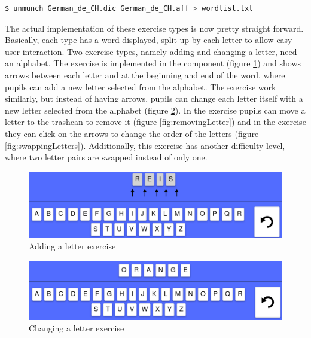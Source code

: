 \begin{lstlisting}[language=Bash,caption={Bash command to unmunch a dictionary file and a affix file to a list of words},label={lst:unmunch}]
$ unmunch German_de_CH.dic German_de_CH.aff > wordlist.txt
\end{lstlisting}

The actual implementation of these exercise types is now pretty straight forward. Basically, each type has a word displayed, split up by each letter to allow easy user interaction. Two exercise types, namely adding and changing a letter, need an alphabet. The  exercise is implemented in the  component (figure \ref{fig:addingLetter}) and shows arrows between each letter and at the beginning and end of the word, where pupils can add a new letter selected from the alphabet. The  exercise work similarly, but instead of having arrows, pupils can change each letter itself with a new letter selected from the alphabet (figure \ref{fig:changingLetter}). In the  exercise pupils can move a letter to the trashcan to remove it (figure \ref{fig:removingLetter}) and in the  exercise they can click on the arrows to change the order of the letters (figure \ref{fig:swappingLetters}). Additionally, this exercise has another difficulty level, where two letter pairs are swapped instead of only one.

\begin{figure} 
  \centering
  \includegraphics[width=1.0 \columnwidth]{figures/words_add.png}
  \caption{Adding a letter exercise} 
  \label{fig:addingLetter} 
\end{figure}

\begin{figure} 
  \centering
  \includegraphics[width=1.0 \columnwidth]{figures/words_change.png}
  \caption{Changing a letter exercise} 
  \label{fig:changingLetter} 
\end{figure}

